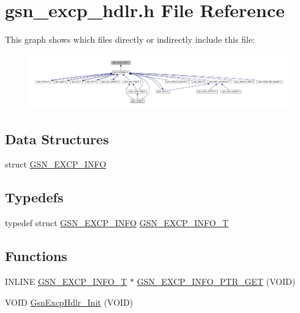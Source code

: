 \hypertarget{a00495}{
\section{gsn\_\-excp\_\-hdlr.h File Reference}
\label{a00495}
}
This graph shows which files directly or indirectly include this file:
\nopagebreak
\begin{figure}[H]
\begin{center}
\leavevmode
\includegraphics[width=400pt]{a00725}
\end{center}
\end{figure}
\subsection*{Data Structures}
\begin{DoxyCompactItemize}
\item 
struct \hyperlink{a00070}{GSN\_\-EXCP\_\-INFO}
\end{DoxyCompactItemize}
\subsection*{Typedefs}
\begin{DoxyCompactItemize}
\item 
typedef struct \hyperlink{a00070}{GSN\_\-EXCP\_\-INFO} \hyperlink{a00495_a1382f90e05b3a64867f144f59481357e}{GSN\_\-EXCP\_\-INFO\_\-T}
\end{DoxyCompactItemize}
\subsection*{Functions}
\begin{DoxyCompactItemize}
\item 
INLINE \hyperlink{a00070}{GSN\_\-EXCP\_\-INFO\_\-T} $\ast$ \hyperlink{a00495_aa06829c5f0b120b7e40d9a406b23ea08}{GSN\_\-EXCP\_\-INFO\_\-PTR\_\-GET} (VOID)
\item 
VOID \hyperlink{a00495_a48094dee3676748b6f98d861ddd96084}{GsnExcpHdlr\_\-Init} (VOID)
\end{DoxyCompactItemize}


